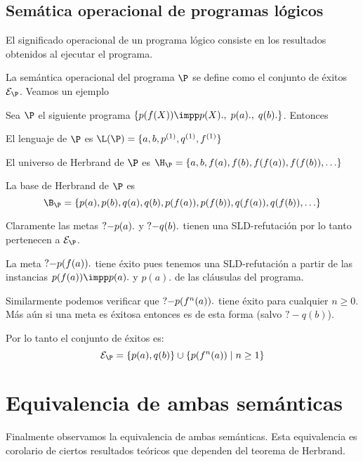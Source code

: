 \documentclass[11pt,letterpaper]{article}
\begin{document}
\subsection{Sem\'atica operacional de programas l\'ogicos}


El significado operacional de un programa l\'ogico consiste en los
resultados obtenidos al ejecutar el programa. 


\noindent
La sem\'antica operacional del programa $\P$ se define como el conjunto
de \'exitos $\mathcal{E}_\P$.  
Veamos un ejemplo

\beje
Sea $\P$ el siguiente programa $\{p(f(X))\impp p(X).,\; p(a).,\; q(b). \}$.
Entonces 
\bi
\item El lenguaje de $\P$ es $\L(\P)=\{a,b,p^{(1)},q^{(1)},f^{(1)}\}$
\item El universo de Herbrand de $\P$ es 
$\H_\P=\{a,b,f(a),f(b),f(f(a)),f(f(b)),\ldots\}$
\item La base de Herbrand de $\P$ es
  \[\B_\P  = \{  p(a),p(b),q(a),q(b),p(f(a)),p(f(b)),q(f(a)),q(f(b)),\ldots\}
\]

\item Claramente las metas $\normalfont{?-}p(a).$ y $\normalfont{?-}q(b).$ 
tienen una SLD-refutaci\'on por lo tanto pertenecen a $\mathcal{E}_\P$.
\item La meta $\normalfont{?-}p(f(a)).$ tiene \'exito pues tenemos una  
SLD-refutaci\'on a partir de las instancias $p(f(a))\impp p(a).$ y $p(a).$ de 
las cl\'ausulas del programa.
\item Similarmente podemos verificar que $\normalfont{?-}p(f^n(a)).$ tiene 
\'exito para cualquier $n\geq 0$. M\'as a\'un si una meta es \'exitosa entonces 
es de esta forma (salvo $?-q(b)$).
\item Por lo tanto el conjunto de \'exitos es:
\[
\mathcal{E}_\P=\{p(a),q(b)\}\cup\{p(f^n(a))\mid n\geq 1\}
\]
\ei
\eeje


\section{Equivalencia de ambas sem\'anticas}

Finalmente observamos la equivalencia de ambas sem\'anticas. Esta equivalencia 
es corolario de ciertos resultados te\'oricos que dependen del teorema de 
Herbrand. 
\end{document}
